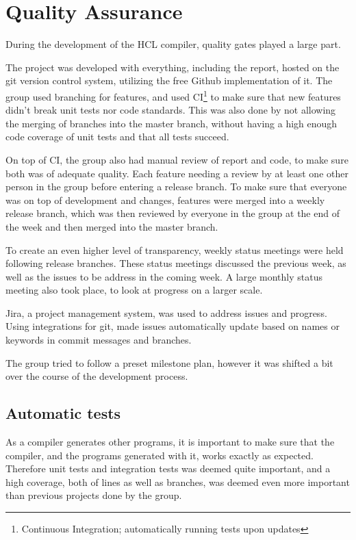 \section{Quality Assurance}
During the development of the HCL compiler, quality gates played a large part.

The project was developed with everything, including the report, hosted on the git\cite{GitProtocol} version control system, utilizing the free Github implementation of it.
The group used branching for features, and used CI\footnote{Continuous Integration; automatically running tests upon updates} to make sure that new features didn't break unit tests nor code standards. 
This was also done by not allowing the merging of branches into the master branch, without having a high enough code coverage of unit tests and that all tests succeed.

On top of CI, the group also had manual review of report and code, to make sure both was of adequate quality. 
Each feature needing a review by at least one other person in the group before entering a release branch.
To make sure that everyone was on top of development and changes, features were merged into a weekly release branch, which was then reviewed by everyone in the group at the end of the week and then merged into the master branch.

To create an even higher level of transparency, weekly status meetings were held following release branches.
These status meetings discussed the previous week, as well as the issues to be address in the coming week. 
A large monthly status meeting also took place, to look at progress on a larger scale. 

Jira\cite{Jira}, a project management system, was used to address issues and progress.
Using integrations for git, made issues automatically update based on names or keywords in commit messages and branches.

The group tried to follow a preset milestone plan, however it was shifted a bit over the course of the development process.

\subsection{Automatic tests}

As a compiler generates other programs, it is important to make sure that the compiler, and the programs generated with it, works exactly as expected.
Therefore unit tests and integration tests was deemed quite important, and a high coverage, both of lines as well as branches, was deemed even more important than previous projects done by the group. 

